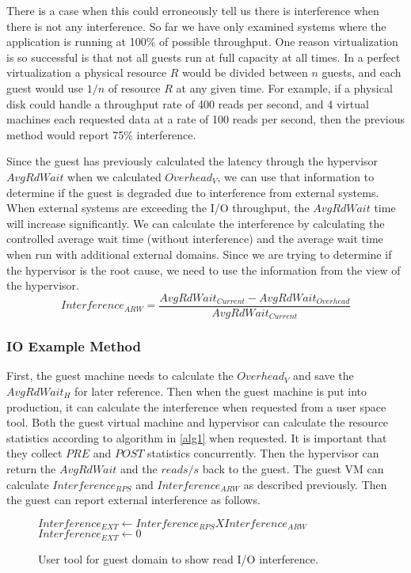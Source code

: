 There is a case when this could erroneously tell us there is interference when there is not any interference.  So far we have only examined systems where the application is running at 100\% of possible throughput.  One reason virtualization is so successful is that not all guests run at full capacity at all times.  In a perfect virtualization a physical resource $R$ would be divided between $n$ guests, and each guest would use $1/n$ of resource $R$ at any given time.  For example, if a physical disk could handle a throughput rate of 400 reads per second, and 4 virtual machines each requested data at a rate of 100 reads per second, then the previous method would report 75\% interference.  

Since the guest has previously calculated the latency through the hypervisor $AvgRdWait$ when we calculated $Overhead_V$, we can use that information to determine if the guest is degraded due to interference from external systems.  When external systems are exceeding the I/O throughput, the $AvgRdWait$ time will increase significantly.  We can calculate the interference by calculating the controlled average wait time (without interference) and the average wait time when run with additional external domains.  Since we are trying to determine if the hypervisor is the root cause, we need to use the information from the view of the hypervisor.
\begin{equation}
	Interference_{ARW} = \frac{AvgRdWait_{Current} - AvgRdWait_{Overhead}}{AvgRdWait_{Current}} 
\end{equation}

\subsubsection{IO Example Method}
First, the guest machine needs to calculate the $Overhead_V$ and save the $AvgRdWait_H$ for later reference.  Then when the guest machine is put into production, it can calculate the interference when requested from a user space tool.  Both the guest virtual machine and hypervisor can calculate the resource statistics according to algorithm in \ref{alg1} when requested.  It is important that they collect $PRE$ and $POST$ statistics concurrently.  Then the hypervisor can return the $AvgRdWait$ and the $reads/s$ back to the guest.   The guest VM can calculate $Interference_{RPS}$ and $Interference_{ARW}$ as described previously.   Then the guest can report external interference as follows.

\begin{figure}[h]
\begin{algorithmic}[H]
 \STATE $Interference_{EXT} \gets Interference_{RPS} X Interference_{ARW}$  
 	\STATE $Interference_{EXT} \gets 0$
 \ENDIF
\end{algorithmic}
\label{alg2}
\caption{User tool for guest domain to show read I/O interference.}
\end{figure}

